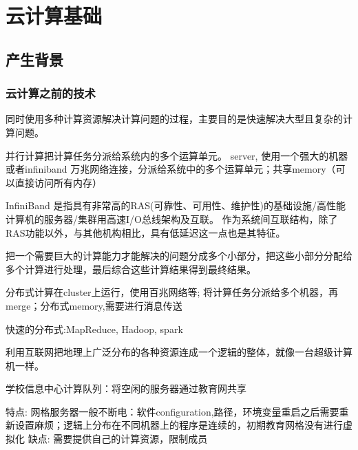 \chapter{云计算基础}

\section{产生背景}

\subsection{云计算之前的技术}

\begin{definition}[并行计算]
    同时使用多种计算资源解决计算问题的过程，主要目的是快速解决大型且复杂的计算问题。 

\end{definition}

并行计算把计算任务分派给系统内的多个运算单元。  server, 使用一个强大的机器或者infiniband 万兆网络连接，分派给系统中的多个运算单元；共享memory（可以直接访问所有内存）

\begin{definition}[InfiniBand]
    InfiniBand 是指具有非常高的RAS(可靠性、可用性、维护性)的基础设施/高性能计算机的服务器/集群用高速I/O总线架构及互联。 作为系统间互联结构，除了RAS功能以外，与其他机构相比，具有低延迟这一点也是其特征。 
\end{definition}

\begin{definition}[分布式计算]
    把一个需要巨大的计算能力才能解决的问题分成多个小部分，把这些小部分分配给多个计算进行处理，最后综合这些计算结果得到最终结果。 
\end{definition}

分布式计算在cluster上运行，使用百兆网络等; 将计算任务分派给多个机器，再merge；分布式memory,需要进行消息传送

快速的分布式:MapReduce, Hadoop, spark

\begin{definition}[网格计算]
    利用互联网把地理上广泛分布的各种资源连成一个逻辑的整体，就像一台超级计算机一样。 
\end{definition}

\begin{example}[教育网格]
    学校信息中心计算队列：将空闲的服务器通过教育网共享

    特点: 网格服务器一般不断电：软件configuration,路径，环境变量重启之后需要重新设置麻烦；逻辑上分布在不同机器上的程序是连续的，初期教育网格没有进行虚拟化
    缺点: 需要提供自己的计算资源，限制成员
\end{example}

